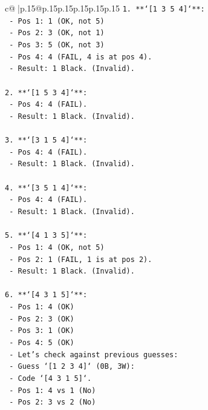 \documentclass{article}
\begin{document}
{\begin{supertabular}{c@{$\;$}|p{.15\linewidth}@{}p{.15\linewidth}p{.15\linewidth}p{.15\linewidth}p{.15\linewidth}p{.15\linewidth}}
{{{\texttt{1.  **`{[}1 3 5 4{]}`**:} \\
\texttt{    {-} Pos 1: 1 (OK, not 5)} \\
\texttt{    {-} Pos 2: 3 (OK, not 1)} \\
\texttt{    {-} Pos 3: 5 (OK, not 3)} \\
\texttt{    {-} Pos 4: 4 (FAIL, 4 is at pos 4).} \\
\texttt{    {-} Result: 1 Black. (Invalid).} \\
\\ 
\texttt{2.  **`{[}1 5 3 4{]}`**:} \\
\texttt{    {-} Pos 4: 4 (FAIL).} \\
\texttt{    {-} Result: 1 Black. (Invalid).} \\
\\ 
\texttt{3.  **`{[}3 1 5 4{]}`**:} \\
\texttt{    {-} Pos 4: 4 (FAIL).} \\
\texttt{    {-} Result: 1 Black. (Invalid).} \\
\\ 
\texttt{4.  **`{[}3 5 1 4{]}`**:} \\
\texttt{    {-} Pos 4: 4 (FAIL).} \\
\texttt{    {-} Result: 1 Black. (Invalid).} \\
\\ 
\texttt{5.  **`{[}4 1 3 5{]}`**:} \\
\texttt{    {-} Pos 1: 4 (OK, not 5)} \\
\texttt{    {-} Pos 2: 1 (FAIL, 1 is at pos 2).} \\
\texttt{    {-} Result: 1 Black. (Invalid).} \\
\\ 
\texttt{6.  **`{[}4 3 1 5{]}`**:} \\
\texttt{    {-} Pos 1: 4 (OK)} \\
\texttt{    {-} Pos 2: 3 (OK)} \\
\texttt{    {-} Pos 3: 1 (OK)} \\
\texttt{    {-} Pos 4: 5 (OK)} \\
\texttt{    {-} Let's check against previous guesses:} \\
\texttt{        {-} Guess `{[}1 2 3 4{]}` (0B, 3W):} \\
\texttt{            {-} Code `{[}4 3 1 5{]}`.} \\
\texttt{            {-} Pos 1: 4 vs 1 (No)} \\
\texttt{            {-} Pos 2: 3 vs 2 (No)} \\
}}}
\end{supertabular}}
\end{document}
